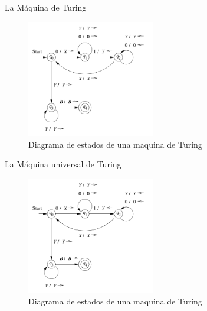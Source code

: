 \documentclass{beamer}
\begin{document}
	\begin{frame}{La Máquina de Turing}
		
			\begin{figure}
			\includegraphics[width=0.5\textwidth]{diagrama_estados.png} 
			\caption{Diagrama de estados de una maquina de Turing}
			\end{figure}
		
	\end{frame}
	
		\begin{frame}{La Máquina universal de Turing}
		
		\begin{figure}
			\includegraphics[width=0.5\textwidth]{diagrama_estados.png} 
			\caption{Diagrama de estados de una maquina de Turing}
		\end{figure}
		
	\end{frame}
	
\end{document}
